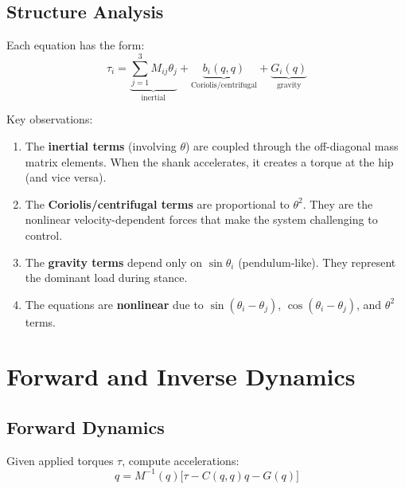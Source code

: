 \documentclass[11pt,a4paper]{article}
\newcommand{\vc}[1]{\bm{#1}}
\newcommand{\mat}[1]{\bm{#1}}
\newcommand{\dt}[1]{\dot{#1}}
\newcommand{\ddt}[1]{\ddot{#1}}
\def\vc#1{#1}%
\def\mat#1{#1}%
\def\dt#1{#1}%
\def\ddt#1{#1}%
\def\bm#1{#1}%
\begin{document}
\subsection*{Structure Analysis}

Each equation has the form:
\begin{equation}
    \tau_i = \underbrace{\sum_{j=1}^{3} M_{ij} \ddt{\theta}_j}_{\text{inertial}}
           + \underbrace{b_i(\vc{q}, \dt{\vc{q}})}_{\text{Coriolis/centrifugal}}
           + \underbrace{G_i(\vc{q})}_{\text{gravity}}
\end{equation}

Key observations:
\begin{enumerate}
    \item The \textbf{inertial terms} (involving $\ddt{\theta}$) are coupled through
          the off-diagonal mass matrix elements. When the shank accelerates,
          it creates a torque at the hip (and vice versa).
    \item The \textbf{Coriolis/centrifugal terms} are proportional to $\dt{\theta}^2$.
          They are the nonlinear velocity-dependent forces that make the system
          challenging to control.
    \item The \textbf{gravity terms} depend only on $\sin\theta_i$ (pendulum-like).
          They represent the dominant load during stance.
    \item The equations are \textbf{nonlinear} due to $\sin(\theta_i - \theta_j)$,
          $\cos(\theta_i - \theta_j)$, and $\dt{\theta}^2$ terms.
\end{enumerate}

\section{Forward and Inverse Dynamics}

\subsection{Forward Dynamics}

Given applied torques $\vc{\tau}$, compute accelerations:
\begin{equation}
\boxed{
    \ddt{\vc{q}} = \mat{M}^{-1}(\vc{q}) \bigl[\vc{\tau} - \vc{C}(\vc{q},\dt{\vc{q}})\dt{\vc{q}} - \vc{G}(\vc{q})\bigr]
}
\label{eq:forward_dynamics}
\end{equation}
\end{document}
